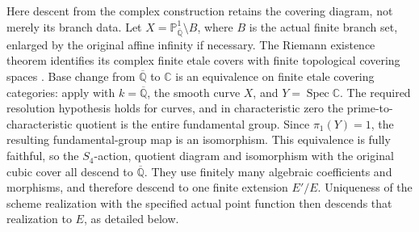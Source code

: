 Here descent from the complex construction retains the
covering diagram, not merely its branch data. Let
\(X=\mathbb P^1_{\overline{\mathbb Q}}\setminus B\),
where \(B\) is the actual finite branch set, enlarged
by the original affine infinity if necessary. The
Riemann existence theorem identifies its complex finite
etale covers with finite topological covering spaces
\citep[Expose~XII, Theoreme~5.1]{FF_SGA1}.
Base change from \(\overline{\mathbb Q}\) to
\(\mathbb C\) is an equivalence on finite etale
covering categories: apply
\citet[Expose~XIII, Proposition~4.6(a)]{FF_SGA1}
with \(k=\overline{\mathbb Q}\), the smooth curve
\(X\), and \(Y=\operatorname{Spec}\mathbb C\).
The required resolution hypothesis holds for curves,
and in characteristic zero the prime-to-characteristic
quotient is the entire fundamental group. Since
\(\pi_1(Y)=1\), the resulting fundamental-group map
is an isomorphism. This equivalence is fully faithful,
so the \(S_4\)-action, quotient diagram and isomorphism
with the original cubic cover all descend to
\(\overline{\mathbb Q}\). They use finitely many
algebraic coefficients and morphisms, and therefore
descend to one finite extension \(E'/E\).
Uniqueness of the scheme realization with the specified
actual point function then descends that realization
to \(E\), as detailed below.

